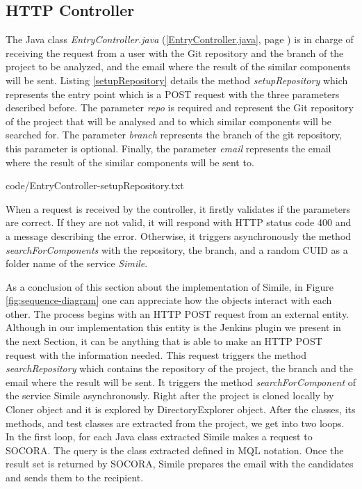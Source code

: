 \subsection{HTTP Controller}
The Java class \emph{EntryController.java} (\ref{EntryController.java}, page \pageref{EntryController.java}) is in charge of receiving the request from a user with the Git repository and the branch of the project to be analyzed, and the email where the result of the similar components will be sent. Listing \ref{setupRepository} details the method \emph{setupRepository} which represents the entry point which is a POST request with the three parameters described before. The parameter \emph{repo} is required and represent the Git repository of the project that will be analysed and to which similar components will be searched for. The parameter \emph{branch} represents the branch of the git repository, this parameter is optional. Finally, the parameter \emph{email} represents the email where the result of the similar components will be sent to.


{code/EntryController-setupRepository.txt}

When a request is received by the controller, it firstly validates if the parameters are correct. If they are not valid, it will respond with HTTP status code 400 and a message describing the error. Otherwise, it triggers asynchronously the method \emph{searchForComponents} with the repository, the branch, and a random CUID as a folder name of the service \emph{Simile}.

As a conclusion of this section about the implementation of Simile, in Figure \ref{fig:sequence-diagram} one can appreciate how the objects interact with each other. The process begins with an HTTP POST request from an external entity. Although in our implementation this entity is the Jenkins plugin we present in the next Section, it can be anything that is able to make an HTTP POST request with the information needed. This request triggers the method \emph{searchRepository} which contains the repository of the project, the branch and the email where the result will be sent. It triggers the method \emph{searchForComponent} of the service Simile asynchronously. Right after the project is cloned locally by Cloner object and it is explored by DirectoryExplorer object. After the classes, its methods, and test classes are extracted from the project, we get into two loops. In the first loop, for each Java class extracted Simile makes a request to SOCORA. The query is the class extracted defined in MQL notation. Once the result set is returned by SOCORA, Simile prepares the email with the candidates and sends them to the recipient.
 
